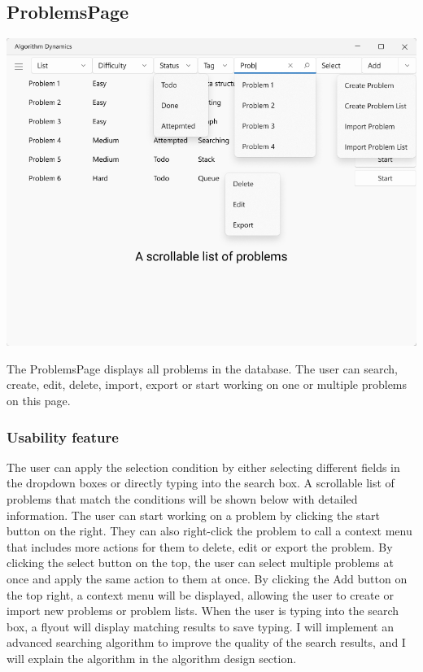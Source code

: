 \documentclass[a4paper]{report}
\begin{document}
\subsection{ProblemsPage}

\includegraphics[width=\textwidth, height=\textheight, keepaspectratio]{ProblemsPage-design}

The ProblemsPage displays all problems in the database. The user can search, create, edit, delete, import, export or start working on one or multiple problems on this page.

\subsubsection{Usability feature}

The user can apply the selection condition by either selecting different fields in the dropdown boxes or directly typing into the search box. A scrollable list of problems that match the conditions will be shown below with detailed information. The user can start working on a problem by clicking the start button on the right. They can also right-click the problem to call a context menu that includes more actions for them to delete, edit or export the problem. By clicking the select button on the top, the user can select multiple problems at once and apply the same action to them at once. By clicking the Add button on the top right, a context menu will be displayed, allowing the user to create or import new problems or problem lists. When the user is typing into the search box, a flyout will display matching results to save typing. I will implement an advanced searching algorithm to improve the quality of the search results, and I will explain the algorithm in the algorithm design section.
\end{document}
